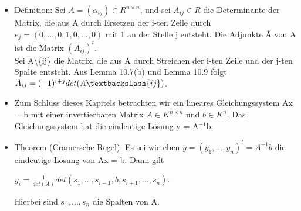 \begin{itemize}
\item Definition: Sei $A = (\alpha_{ij}) \in R^{n \times n}$, und sei $A_{ij} \in R$ die Determinante der Matrix, die aus A durch Ersetzen der i-ten Zeile durch $e_j = (0,...,0,1,0,...,0)$ mit 1 an der Stelle j entsteht. Die Adjunkte \~{A} von A ist die Matrix $(A_{ij})^t$.\\
Sei A\textbackslash\{ij\} die Matrix, die aus A durch Streichen der i-ten Zeile und der j-ten Spalte entsteht. Aus Lemma 10.7(b) und Lemma 10.9 folgt $A_{ij} =(-1)^{i+j} det(A\textbackslash\{ij\})$.
\item Zum Schluss dieses Kapitels betrachten wir ein lineares Gleichungssystem Ax = b mit einer invertierbaren Matrix $A \in K^{n \times n}$ und $b \in K^n$. Das Gleichungssystem hat die eindeutige Lösung y = A$^{-1}$b.
\item Theorem (Cramersche Regel): Es sei wie eben $y = (y_1, …, y_n)^t = A^{-1}b$ die eindeutige Lösung von Ax = b. Dann gilt
\begin{center}
$y_i = \frac{1}{det(A)} det(s_1, …, s_{i-1}, b, s_{i+1}, …, s_n)$.
\end{center}
Hierbei sind $s_1, …, s_n$ die Spalten von A.\\
\end{itemize}

